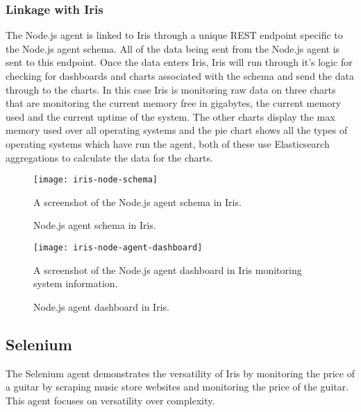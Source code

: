 \documentclass[12pt,a4paper,titlepage]{report}
\begin{document}
\subsubsection{Linkage with Iris}
The Node.js agent is linked to Iris through a unique REST endpoint specific to the Node.js agent schema. All of the data being sent from the Node.js agent is sent to this endpoint. Once the data enters Iris, Iris will run through it's logic for checking for dashboards and charts associated with the schema and send the data through to the charts. 
In this case Iris is monitoring raw data on three charts that are monitoring the current memory free in gigabytes, the current memory used and the current uptime of the system. The other charts display the max memory used over all operating systems and the pie chart shows all the types of operating systems which have run the agent, both of these use Elasticsearch aggregations to calculate the data for the charts.

\begin{figure}[H]
\begin{tcolorbox}
\begin{center}
\texttt{[image: iris-node-schema]}
\end{center}
A screenshot of the Node.js agent schema in Iris.
\end{tcolorbox}
\caption{Node.js agent schema in Iris.}
\end{figure}

\begin{figure}[H]
\begin{tcolorbox}
\begin{center}
\texttt{[image: iris-node-agent-dashboard]}
\end{center}
A screenshot of the Node.js agent dashboard in Iris monitoring system information.
\end{tcolorbox}
\caption{Node.js agent dashboard in Iris.}
\end{figure}


\subsection{Selenium}
The Selenium agent demonstrates the versatility of Iris by monitoring the price of a guitar by scraping music store websites and monitoring the price of the guitar. This agent focuses on versatility over complexity.
\end{document}
